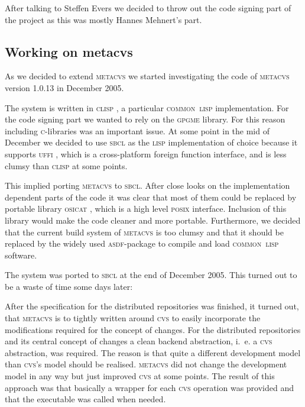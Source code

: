 \documentclass[fleqn, 10pt, a4paper]{report} \usepackage{amssymb}
\begin{document}
After talking to Steffen Evers we decided to throw out the code signing
part of the project as this was mostly Hannes Mehnert's part.


\subsection{Working on {\sc metacvs}}

As we decided to extend \textsc{metacvs} we started investigating the
code of \textsc{metacvs} version 1.0.13 in December 2005.

The system is written in \textsc{clisp} \cite{Clis06}, a particular
\textsc{common~lisp} implementation. For the code signing part we
wanted to rely on the \textsc{gpgme} \cite{Gnup06} library. For this
reason including \textsc{c}-libraries was an important issue. At some
point in the mid of December we decided to use \textsc{sbcl}
\cite{Sbcl06} as the \textsc{lisp} implementation of choice because it
supports \textsc{uffi} \cite{Uffi06}, which is a cross-platform
foreign function interface, and is less clumsy than \textsc{clisp} at
some points.

This implied porting \textsc{metacvs} to \textsc{sbcl}. After close
looks on the implementation dependent parts of the code it was clear
that most of them could be replaced by portable library
\textsc{osicat} \cite{Osic06}, which is a high level \textsc{posix}
interface.  Inclusion of this library would make the code cleaner and
more portable. Furthermore, we decided that the current build system
of \textsc{metacvs} is too clumsy and that it should be replaced by
the widely used \textsc{asdf}-package \cite{Asdf06} to compile and
load \textsc{common~lisp} software.

The system was ported to \textsc{sbcl} at the end of December 2005.
This turned out to be a waste of time some days later:

After the specification for the distributed repositories was finished,
it turned out, that \textsc{metacvs} is to tightly written around
\textsc{cvs} to easily incorporate the modifications required for the
concept of changes. For the distributed repositories and its central
concept of changes a clean backend abstraction, i.~e. a \textsc{cvs}
abstraction, was required. The reason is that quite a different
development model than \textsc{cvs}'s model should be realised.
\textsc{metacvs} did not change the development model in any way but
just improved \textsc{cvs} at some points. The result of this
approach was that basically a wrapper for each \textsc{cvs} operation
was provided and that the executable was called when needed.
\end{document}
